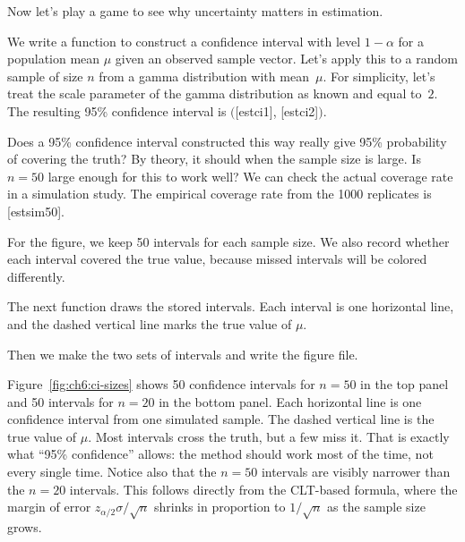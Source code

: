 Now let's play a game to see why uncertainty matters in
estimation.
\begin{example}
\label{ex:ci-clt}
We write a function to construct a confidence interval with level
$1 - \alpha$ for a population mean $\mu$ given an observed sample
vector.
Let's apply this to a random sample of size $n$ from a gamma
distribution with mean~$\mu$. For simplicity, let's treat the scale
parameter of the gamma distribution as known and equal to~$2$.
The resulting 95\% confidence interval is
$($[estci1],
[estci2]$)$.


Does a 95\% confidence interval constructed this way really give 95\%
probability of covering the truth? By theory, it should when the sample
size is large. Is $n = 50$ large enough for this to work well? We can
check the actual coverage rate in a simulation study.
The empirical coverage rate from the 1000 replicates is
[estsim50].

For the figure, we keep 50 intervals for each sample size. We also
record whether each interval covered the true value, because missed
intervals will be colored differently.


The next function draws the stored intervals. Each interval is one horizontal
line, and the dashed vertical line marks the true value of \(\mu\).


Then we make the two sets of intervals and write the figure file.


Figure~\ref{fig:ch6:ci-sizes} shows 50 confidence intervals for
$n = 50$ in the top panel and 50 intervals for $n = 20$ in the bottom
panel. Each horizontal line is one confidence interval from one
simulated sample. The dashed vertical line is the true value of $\mu$.
Most intervals cross the truth, but a few miss it. That is exactly what
``95\% confidence'' allows: the method should work most of the time, not
every single time. Notice also that the $n = 50$ intervals are visibly
narrower than the $n = 20$ intervals. This follows directly from the
CLT-based formula, where the margin of error
$z_{\alpha/2}\sigma/\sqrt{n}$ shrinks in proportion to $1/\sqrt{n}$ as
the sample size grows.


\end{example}

